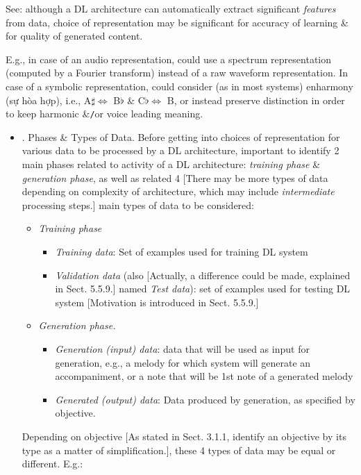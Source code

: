 \documentclass{article}
\begin{document}
\begin{itemize}
	See: although a DL architecture can automatically extract significant {\it features} from data, choice of representation may be significant for accuracy of learning \& for quality of generated content.

	E.g., in case of an audio representation, could use a spectrum representation (computed by a Fourier transform) instead of a raw waveform representation. In case of a symbolic representation, could consider (as in most systems) enharmony (sự hòa hợp), i.e., A$\sharp\Leftrightarrow$ B$\flat$ \& C$\flat\Leftrightarrow$ B, or instead preserve distinction in order to keep harmonic \&{\tt/}or voice leading meaning.
	\begin{itemize}
		\item {. Phases \& Types of Data.} Before getting into choices of representation for various data to be processed by a DL architecture, important to identify 2 main phases related to activity of a DL architecture: {\it training phase} \& {\it generation phase}, as well as related 4 [There may be more types of data depending on complexity of architecture, which may include {\it intermediate} processing steps.] main types of data to be considered:
		\begin{itemize}
			\item {\it Training phase}
			\begin{itemize}
				\item {\it Training data}: Set of examples used for training DL system
				\item {\it Validation data} (also [Actually, a difference could be made, explained in Sect. 5.5.9.] named {\it Test data}): set of examples used for testing DL system [Motivation is introduced in Sect. 5.5.9.]
			\end{itemize}
			\item {\it Generation phase.}
			\begin{itemize}
				\item {\it Generation (input) data}: data that will be used as input for generation, e.g., a melody for which system will generate an accompaniment, or a note that will be 1st note of a generated melody
				\item {\it Generated (output) data}: Data produced by generation, as specified by objective.
			\end{itemize}
		\end{itemize}
		Depending on objective [As stated in Sect. 3.1.1, identify an objective by its type as a matter of simplification.], these 4 types of data may be equal or different. E.g.:

\end{itemize}
\end{itemize}
\end{document}
